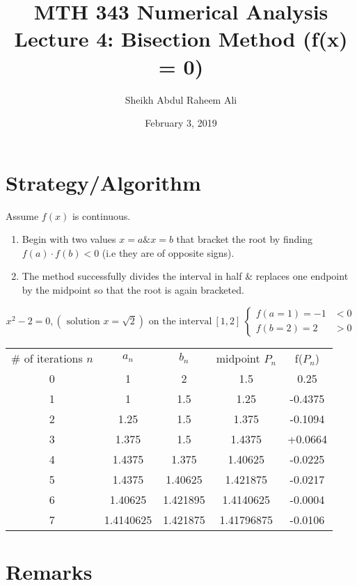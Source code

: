 \documentclass[]{article}
\title{MTH 343 Numerical Analysis Lecture 4: Bisection Method (f(x) = 0)}
\author{Sheikh Abdul Raheem Ali}
\date{February 3, 2019}
\begin{document}
	
	\maketitle
	
	\section*{Strategy/Algorithm}
	
	Assume $ f(x) $ is continuous.
	
	\begin{enumerate}
		\item Begin with two values $ x = a \& x = b $ that bracket the root by finding $ f(a) \cdot f(b) < 0  $ (i.e they are of opposite signs).
		
		\item The method successfully divides the interval in half \& replaces one endpoint by the midpoint so that the root is again bracketed.
		
	\end{enumerate}
	
	\[ x^2 - 2 = 0, (\text{ solution } x = \sqrt{2}) \text{ on the interval} \ [1,2] \ \begin{cases}
	f(a = 1) = -1 & < 0 \\
	f(b = 2) = 2 & > 0
	\end{cases}\]
	
	\begin{tabular}{c c c c c}
		\# of iterations \textbf{$ n $} & \textbf{$ a_n $} & \textbf{$ b_n $} & midpoint \textbf{$ P_n $} & f($ P_n $) \\
		
		0&1&2&1.5&0.25 \\
		1&1&1.5&1.25& -0.4375\\
		2&1.25&1.5&1.375& -0.1094\\
		3&1.375&1.5&1.4375& +0.0664\\
		4&1.4375&1.375&1.40625& -0.0225\\
		5&1.4375&1.40625&1.421875& -0.0217\\
		6&1.40625&1.421895&1.4140625& -0.0004\\
		7&1.4140625&1.421875&1.41796875& -0.0106
		
		 
	\end{tabular}
\section*{Remarks}
\end{document}
